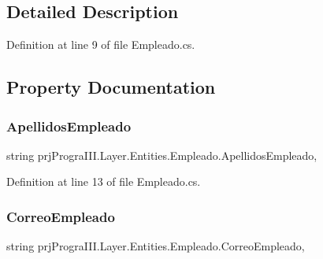 \subsection{Detailed Description}


Definition at line 9 of file Empleado.\+cs.



\subsection{Property Documentation}
\hypertarget{classprj_progra_i_i_i_1_1_layer_1_1_entities_1_1_empleado_a329a9f47ed75d4908c65d10bfac0da11}{}\label{classprj_progra_i_i_i_1_1_layer_1_1_entities_1_1_empleado_a329a9f47ed75d4908c65d10bfac0da11} 
\subsubsection{\texorpdfstring{Apellidos\+Empleado}{ApellidosEmpleado}}
{\footnotesize\ttfamily string prj\+Progra\+I\+I\+I.\+Layer.\+Entities.\+Empleado.\+Apellidos\+Empleado\hspace{0.3cm}{\ttfamily [get]}, {\ttfamily [set]}}



Definition at line 13 of file Empleado.\+cs.

\hypertarget{classprj_progra_i_i_i_1_1_layer_1_1_entities_1_1_empleado_a6e2504f985ee7d23b50503022b28c4c5}{}\label{classprj_progra_i_i_i_1_1_layer_1_1_entities_1_1_empleado_a6e2504f985ee7d23b50503022b28c4c5} 
\subsubsection{\texorpdfstring{Correo\+Empleado}{CorreoEmpleado}}
{\footnotesize\ttfamily string prj\+Progra\+I\+I\+I.\+Layer.\+Entities.\+Empleado.\+Correo\+Empleado\hspace{0.3cm}{\ttfamily [get]}, {\ttfamily [set]}}



